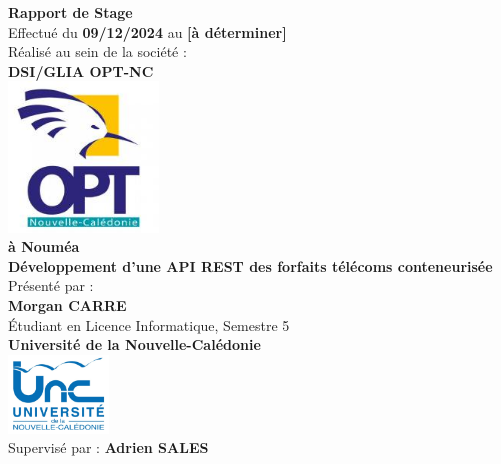 \documentclass{article}
\begin{document}
	
	\begin{titlepage}
		\begin{center}
			{\LARGE \textbf{Rapport de Stage}} \\[1.5cm]
			{\large Effectué du \textbf{09/12/2024} au \textbf{[à déterminer]}} \\[1cm]
			
			
			
			{\large Réalisé au sein de la société :} \\[1cm]
			{\Large \textbf{DSI/GLIA OPT-NC}} \\[1cm]
			
			\includegraphics[width=0.3\textwidth]{asset/logo_opt.jpg} \\[1cm] 
			
			
			\textbf{à Nouméa} \\[1cm]
			
			{\large \textbf{Développement d'une API REST des forfaits télécoms conteneurisée}} \\[1cm]
			
			{\large Présenté par :} \\[1cm]
			{\LARGE \textbf{Morgan CARRE}} \\[0.5cm]
			Étudiant en Licence Informatique, Semestre 5 \\[0.5cm]
			\textbf{Université de la Nouvelle-Calédonie} \\[0.5cm]
			
			\includegraphics[width=0.2\textwidth]{asset/logo_universite.jpg} \\[2cm]
			
			{\large Supervisé par : \textbf{Adrien SALES}} \\[0.5cm]
		\end{center}
	\end{titlepage}
	
\end{document}

